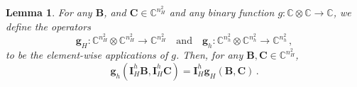 \documentclass[10pt,a4paper]{amsart}
\newtheorem{lemma}{Lemma}
\begin{document}
\begin{lemma}\label{lem:binary}
    For any $\bm{B}$, and $\bm{C}\in\mathbb{C}^{n_H^2}$ and any binary function $g:\mathbb{C}\otimes\mathbb{C}\to\mathbb{C}$, we define the operators
\begin{equation*}
    \bm{g}_H:\mathbb{C}^{n_H^2}\otimes\mathbb{C}^{n_H^2}\to\mathbb{C}^{n_H^2}\quad\text{and}\quad \bm{g}_h:\mathbb{C}^{n_h^2}\otimes\mathbb{C}^{n_h^2}\to\mathbb{C}^{n_h^2}\,,
\end{equation*}
to be the element-wise applications of $g$. Then, for any $\bm{B},\bm{C}\in\mathbb{C}^{n_H^2}$,
\begin{equation*}
    \bm{g}_h\left(\bm{I}_H^h\bm{B},\bm{I}_H^h\bm{C}\right)= \bm{I}_H^h\bm{g}_H(\bm{B},\bm{C})\,.
\end{equation*}
\end{lemma}
\end{document}
